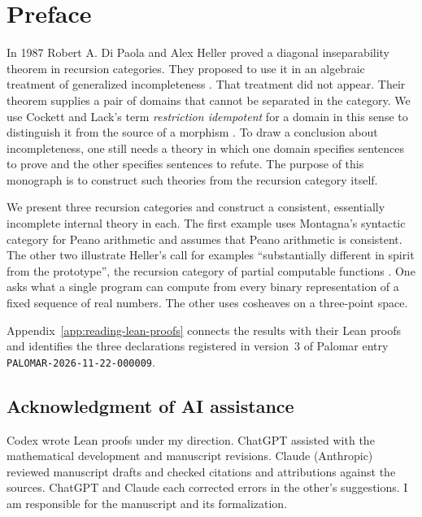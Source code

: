 \section*{Preface}

In 1987 Robert A. Di Paola and Alex Heller proved a diagonal
inseparability theorem in recursion categories. They proposed to use it
in an algebraic treatment of generalized incompleteness
\cite[Theorem~8.15 and p.~629]{DPH}. That treatment did not appear.
Their theorem supplies a pair of domains that cannot be separated in
the category. We use Cockett and Lack's term \emph{restriction idempotent}
for a domain in this sense to distinguish it from the source of a morphism
\cite[p.~227]{CockettLack}. To draw a conclusion about incompleteness, one still needs
a theory in which one domain specifies sentences to prove and the other
specifies sentences to refute. The purpose of this monograph is to
construct such theories from the recursion category itself.

We present three recursion categories and construct a consistent,
essentially incomplete internal theory in each. The first example uses
Montagna's syntactic category for Peano arithmetic and assumes that
Peano arithmetic is consistent. The other two illustrate Heller's call
for examples ``substantially different in spirit from the prototype'',
the recursion category of partial computable functions
\cite[p.~1252]{Heller}. One asks what a single program can compute
from every binary representation of a fixed sequence of real numbers.
The other uses cosheaves on a three-point space.

Appendix~\ref{app:reading-lean-proofs} connects the results with their
Lean proofs and identifies the three declarations registered in version~3
of Palomar entry \texttt{PALOMAR-2026-11-22-000009}.

\subsection*{Acknowledgment of AI assistance}

Codex wrote Lean proofs under my direction. ChatGPT assisted with the
mathematical development and manuscript revisions. Claude (Anthropic)
reviewed manuscript drafts and checked citations and attributions against
the sources. ChatGPT and Claude each corrected errors in the other's
suggestions. I am responsible for the manuscript and its formalization.
